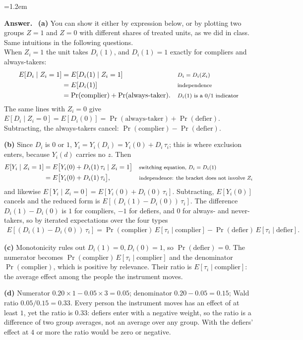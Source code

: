 \documentclass[11pt]{article}
\newcommand{\E}{E}
\newenvironment{answer}{\par\smallskip
  \begin{list}{}{\leftmargin=1.2em\rightmargin=0pt}\item[]\color{dukeblue}%
  \textbf{Answer.}\ }{\end{list}\smallskip}
\begin{document}
\begin{answer}
\textbf{(a)} You can show it either by expression below, or by plotting two groups $Z = 1$ and $Z = 0$ with different shares of treated units, as we did in class. Same intuitions in the following questions. \\

When $Z_i = 1$ the unit takes $D_i(1)$, and $D_i(1) = 1$ exactly for compliers
and always-takers:
\begin{align*}
  \E[D_i\mid Z_i=1]
  &= \E[D_i(1)\mid Z_i=1]
  && \text{\footnotesize $D_i = D_i(Z_i)$} \\
  &= \E[D_i(1)]
  && \text{\footnotesize independence} \\
  &= \Pr(\text{complier}) + \Pr(\text{always-taker}) .
  && \text{\footnotesize $D_i(1)$ is a $0/1$ indicator}
\end{align*}
The same lines with $Z_i = 0$ give $\E[D_i\mid Z_i=0] = \E[D_i(0)] = \Pr(\text{always-taker})
+ \Pr(\text{defier})$. Subtracting, the always-takers cancel:
$\Pr(\text{complier}) - \Pr(\text{defier})$.
\par\textbf{(b)} Since $D_i$ is $0$ or $1$, $Y_i = Y_i(D_i) = Y_i(0) + D_i\,\tau_i$; this is
where exclusion enters, because $Y_i(d)$ carries no $z$. Then
\begin{align*}
  \E[Y_i\mid Z_i=1]
  &= \E\big[Y_i(0) + D_i(1)\,\tau_i \mid Z_i=1\big]
  && \text{\footnotesize switching equation, $D_i = D_i(1)$} \\
  &= \E\big[Y_i(0) + D_i(1)\,\tau_i\big] ,
  && \text{\footnotesize independence: the bracket does not involve $Z_i$}
\end{align*}
and likewise $\E[Y_i\mid Z_i=0] = \E[Y_i(0) + D_i(0)\,\tau_i]$. Subtracting, $\E[Y_i(0)]$
cancels and the reduced form is $\E[(D_i(1) - D_i(0))\,\tau_i]$. The difference
$D_i(1) - D_i(0)$ is $1$ for compliers, $-1$ for defiers, and $0$ for always- and
never-takers, so by iterated expectations over the four types
\begin{align*}
  \E[(D_i(1) - D_i(0))\,\tau_i]
  = \Pr(\text{complier})\,\E[\tau_i\mid\text{complier}]
  - \Pr(\text{defier})\,\E[\tau_i\mid\text{defier}] .
\end{align*}
\par\textbf{(c)} Monotonicity rules out $D_i(1) = 0, D_i(0) = 1$, so $\Pr(\text{defier}) = 0$.
The numerator becomes $\Pr(\text{complier})\,\E[\tau_i\mid\text{complier}]$ and the
denominator $\Pr(\text{complier})$, which is positive by relevance. Their ratio is
$\E[\tau_i\mid\text{complier}]$: the average effect among the people the instrument moves.
\par\textbf{(d)} Numerator $0.20 \times 1 - 0.05 \times 3 = 0.05$; denominator $0.20 - 0.05 =
0.15$; Wald ratio $0.05/0.15 = 0.33$. Every person the instrument moves has an effect of at
least $1$, yet the ratio is $0.33$: defiers enter with a negative weight, so the ratio is a
difference of two group averages, not an average over any group. With the defiers' effect
at $4$ or more the ratio would be zero or negative.
\end{answer}
\end{document}
